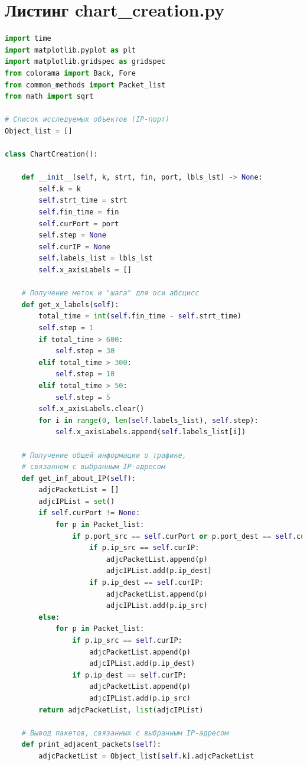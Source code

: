 \documentclass[bachelor, och, coursework]{SCWorks}
\begin{document}
    \section{Листинг chart\_creation.py}

    \begin{lstlisting}[language=Python]
import time
import matplotlib.pyplot as plt
import matplotlib.gridspec as gridspec
from colorama import Back, Fore
from common_methods import Packet_list
from math import sqrt

# Список исследуемых объектов (IP-порт)
Object_list = []

class ChartCreation():

    def __init__(self, k, strt, fin, port, lbls_lst) -> None:
        self.k = k
        self.strt_time = strt
        self.fin_time = fin
        self.curPort = port
        self.step = None
        self.curIP = None
        self.labels_list = lbls_lst
        self.x_axisLabels = []

    # Получение меток и "шага" для оси абсцисс
    def get_x_labels(self):
        total_time = int(self.fin_time - self.strt_time)
        self.step = 1
        if total_time > 600:
            self.step = 30
        elif total_time > 300:
            self.step = 10
        elif total_time > 50:
            self.step = 5
        self.x_axisLabels.clear()
        for i in range(0, len(self.labels_list), self.step):
            self.x_axisLabels.append(self.labels_list[i])

    # Получение общей информации о трафике,
    # связанном с выбранным IP-адресом
    def get_inf_about_IP(self):
        adjcPacketList = []
        adjcIPList = set()
        if self.curPort != None:
            for p in Packet_list:
                if p.port_src == self.curPort or p.port_dest == self.curPort:
                    if p.ip_src == self.curIP:
                        adjcPacketList.append(p)
                        adjcIPList.add(p.ip_dest)
                    if p.ip_dest == self.curIP:
                        adjcPacketList.append(p)
                        adjcIPList.add(p.ip_src)
        else:
            for p in Packet_list:
                if p.ip_src == self.curIP:
                    adjcPacketList.append(p)
                    adjcIPList.add(p.ip_dest)
                if p.ip_dest == self.curIP:
                    adjcPacketList.append(p)
                    adjcIPList.add(p.ip_src)
        return adjcPacketList, list(adjcIPList)

    # Вывод пакетов, связанных с выбранным IP-адресом 
    def print_adjacent_packets(self):
        adjcPacketList = Object_list[self.k].adjcPacketList


\end{lstlisting}
\end{document}
